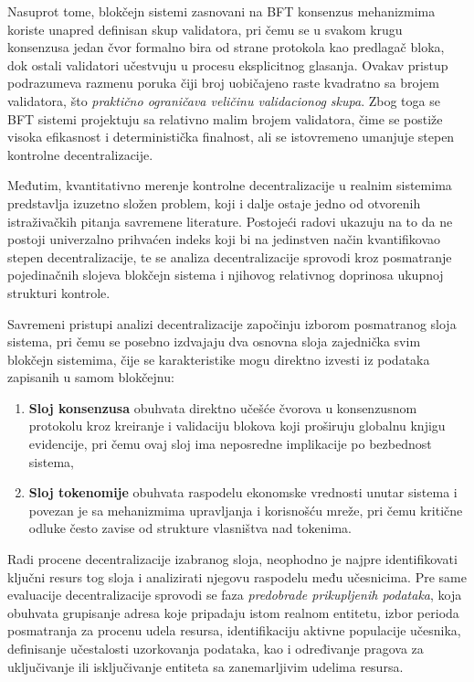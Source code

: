 Nasuprot tome, blokčejn sistemi zasnovani na BFT konsenzus mehanizmima koriste unapred definisan skup validatora, pri čemu se u svakom krugu konsenzusa jedan čvor formalno bira od strane protokola kao predlagač bloka, dok ostali validatori učestvuju u procesu eksplicitnog glasanja. Ovakav pristup podrazumeva razmenu poruka čiji broj uobičajeno raste kvadratno sa brojem validatora, što \textit{praktično ograničava veličinu validacionog skupa}. Zbog toga se BFT sistemi projektuju sa relativno malim brojem validatora, čime se postiže visoka efikasnost i deterministička finalnost, ali se istovremeno umanjuje stepen kontrolne decentralizacije.

Međutim, kvantitativno merenje kontrolne decentralizacije u realnim sistemima predstavlja izuzetno složen problem, koji i dalje ostaje jedno od otvorenih istraživačkih pitanja savremene literature. Postojeći radovi \cite{ovezik2024sok} ukazuju na to da ne postoji univerzalno prihvaćen indeks koji bi na jedinstven način kvantifikovao stepen decentralizacije, te se analiza decentralizacije sprovodi kroz posmatranje pojedinačnih slojeva blokčejn sistema i njihovog relativnog doprinosa ukupnoj strukturi kontrole.

Savremeni pristupi analizi decentralizacije \cite{ovezik2025sok} započinju izborom posmatranog sloja sistema, pri čemu se posebno izdvajaju dva osnovna sloja zajednička svim blokčejn sistemima, čije se karakteristike mogu direktno izvesti iz podataka zapisanih u samom blokčejnu:
\begin{enumerate}
\item \textbf{Sloj konsenzusa}  obuhvata direktno učešće čvorova u konsenzusnom protokolu kroz kreiranje i validaciju blokova koji proširuju globalnu knjigu evidencije, pri čemu ovaj sloj ima neposredne implikacije po bezbednost sistema,
\item \textbf{Sloj tokenomije}  obuhvata raspodelu ekonomske vrednosti unutar sistema i povezan je sa mehanizmima upravljanja i korisnošću mreže, pri čemu kritične odluke često zavise od strukture vlasništva nad tokenima.
\end{enumerate}

Radi procene decentralizacije izabranog sloja, neophodno je najpre identifikovati ključni resurs tog sloja i analizirati njegovu raspodelu među učesnicima. Pre same evaluacije decentralizacije sprovodi se faza \textit{predobrade prikupljenih podataka}, koja obuhvata grupisanje adresa koje pripadaju istom realnom entitetu, izbor perioda posmatranja za procenu udela resursa, identifikaciju aktivne populacije učesnika, definisanje učestalosti uzorkovanja podataka, kao i određivanje pragova za uključivanje ili isključivanje entiteta sa zanemarljivim udelima resursa.

